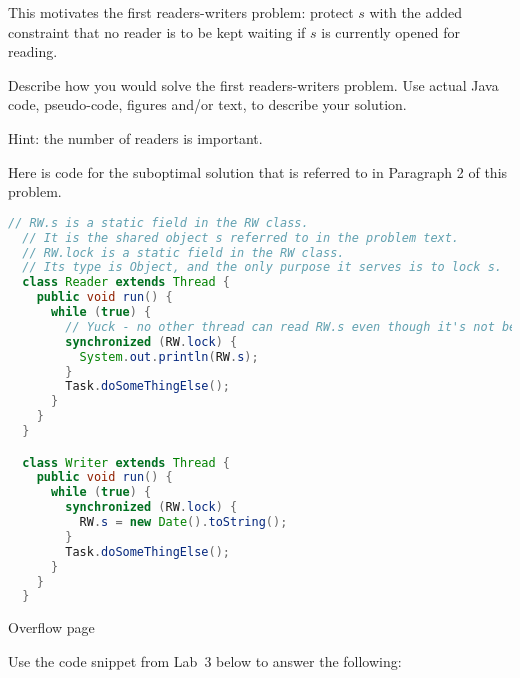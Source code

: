 \documentclass[11pt]{exam}
\begin{document}
\begin{questions}
This motivates the first readers-writers problem:
protect $s$ with the added constraint that no reader is to be kept waiting if
$s$ is currently opened for reading.

Describe how you would solve the first readers-writers problem. Use actual Java
code, pseudo-code, figures and/or text, to describe your solution.

Hint: the number of readers is important.

Here is code for the suboptimal solution that is referred to in Paragraph 2 of
this problem.

\begin{lstlisting}[language=Java]
  // RW.s is a static field in the RW class.
  // It is the shared object s referred to in the problem text.
  // RW.lock is a static field in the RW class.
  // Its type is Object, and the only purpose it serves is to lock s.
  class Reader extends Thread {
    public void run() {
      while (true) {
        // Yuck - no other thread can read RW.s even though it's not being changed
        synchronized (RW.lock) {
          System.out.println(RW.s);
        }
        Task.doSomeThingElse();
      }
    }
  }

  class Writer extends Thread {
    public void run() {
      while (true) {
        synchronized (RW.lock) {
          RW.s = new Date().toString();
        }
        Task.doSomeThingElse();
      }
    }
  }

\end{lstlisting}

\newpage

Overflow page

\newpage


Use the code snippet from Lab~3 below to 
answer the following: 


\end{questions}
\end{document}
